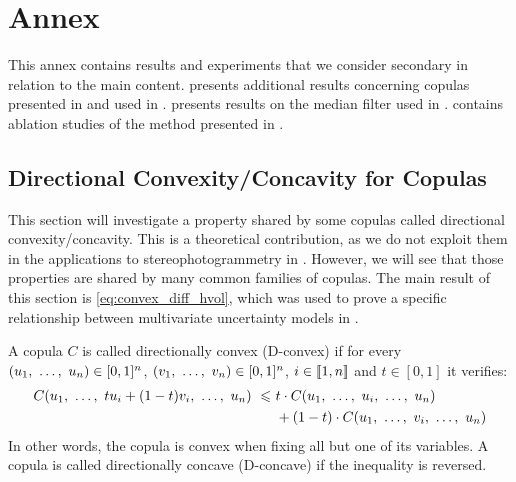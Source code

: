 \makeatletter
\def\@makechapterhead#1{%
  \vspace*{50\p@}%
  {\parindent \z@ \raggedright \normalfont
        \Huge\bfseries \thechapter.\space Annex%
        \vskip 40\p@
  }}
\makeatother

\chapter{Annex}\label{chap:annex}
This annex contains results and experiments that we consider secondary in relation to the main content.  presents additional results concerning copulas presented in  and used in .  presents results on the median filter used in .  contains ablation studies of the method presented in . 


\section{Directional Convexity/Concavity for Copulas}\label{sec:dconvexity}
This section will investigate a property shared by some copulas called directional convexity/concavity. This is a theoretical contribution, as we do not exploit them in the applications to stereophotogrammetry in . However, we will see that those properties are shared by many common families of copulas. The main result of this section is \cref{eq:convex_diff_hvol}, which was used to prove a specific relationship between multivariate uncertainty models in .

\begin{definition}\label{def:convex}
    A copula $C$ is called directionally convex (D-convex) \cite{alvoni_dierent_2007} if for every $(u_1 , ~\ldots, ~ u_n)\in[0,1]^n$, $(v_1, ~\ldots, ~ v_n)\in[0,1]^n$, $i\in[\![1,n]\!]$ and $t\in[0,1]$ it verifies:
    \begin{align}
        C(u_1, ~\ldots, ~ tu_i+(1-t)v_i, ~\ldots, ~ u_n) ~\leqslant~&t\cdot C(u_1, ~\ldots, ~ u_i, ~\ldots, ~ u_n)\nonumber\\
        &+ (1-t)\cdot C(u_1, ~\ldots, ~ v_i, ~\ldots, ~ u_n)\label{eq:convex_copula}
    \end{align}
    In other words, the copula is convex when fixing all but one of its variables. A copula is called directionally concave (D-concave) if the inequality is reversed.
\end{definition}


